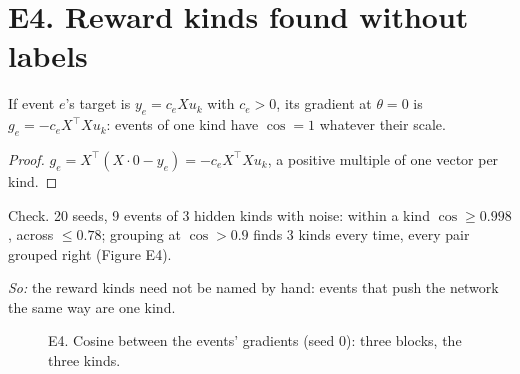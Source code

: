 \section*{E4. Reward kinds found without labels}
\begin{proposition} If event $e$'s target is $y_e=c_eXu_k$ with $c_e>0$, its gradient at $\theta=0$ is
$g_e=-c_eX^\top Xu_k$: events of one kind have $\cos=1$ whatever their scale.\end{proposition}
\begin{proof} $g_e=X^\top(X\cdot0-y_e)=-c_eX^\top Xu_k$, a positive multiple of one vector per kind.\end{proof}
\noindent Check. 20 seeds, 9 events of 3 hidden kinds with noise: within a kind $\cos\ge0.998$, across $\le0.78$;
grouping at $\cos>0.9$ finds 3 kinds every time, every pair grouped right (Figure E4).

\emph{So:} the reward kinds need not be named by hand: events that push the network the same way are one kind.

\begin{figure}[h]\centering
{}
\caption{E4. Cosine between the events' gradients (seed 0): three blocks, the three kinds.}
\end{figure}
